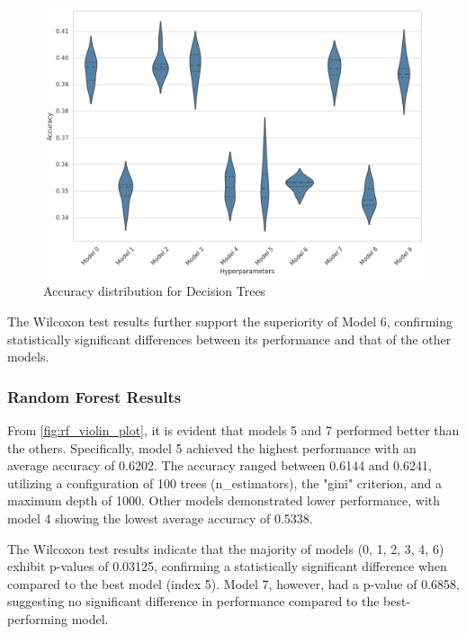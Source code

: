 \begin{figure}[H]
    \centering
    \includegraphics[width=0.99\columnwidth]{images/violin_plot_decision_tree.png}
    \caption{Accuracy distribution for Decision Trees}
    \label{fig:dt_violin_plot}
\end{figure}

The Wilcoxon test results further support the 
superiority of Model 6, confirming statistically 
significant differences between its performance and 
that of the other models.

\subsubsection{Random Forest Results}
From \autoref{fig:rf_violin_plot}, it is evident 
that models 5 and 7 performed better than the others. 
Specifically, model 5 achieved the highest performance 
with an average accuracy of 0.6202. 
The accuracy ranged between 0.6144 and 
0.6241, utilizing a configuration of 
100 trees (n\_estimators), 
the "gini" criterion, and a maximum depth
of 1000. Other models demonstrated lower 
performance, with model 4 showing the lowest average 
accuracy of {0.5338}.

The {Wilcoxon test} results indicate that the 
majority of models (0, 1, 2, 3, 4, 6) exhibit 
{p-values} of {0.03125}, confirming a 
statistically significant difference when compared to 
the best model (index 5). Model 7, however, had a {p-value} 
of {0.6858}, suggesting no significant difference 
in performance compared to the best-performing model.

